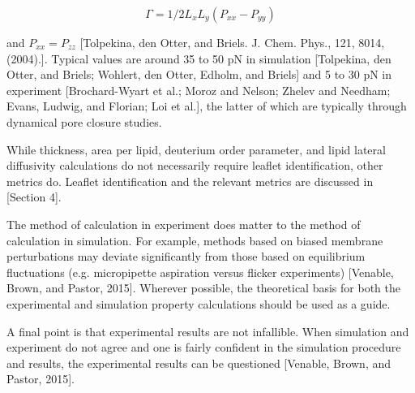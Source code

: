 \documentclass[9pt,bestpractices]{livecoms}
\begin{document}
\begin{equation}
	\label{e:partition}
	\Gamma = 1/2 L_x L_y (P_{xx} - P_{yy})
\end{equation}

and $P_{xx} = P_{zz}$ [Tolpekina, den Otter, and Briels. J. Chem. Phys., 121, 8014, (2004).].
Typical values are around 35 to 50 pN in simulation [Tolpekina, den Otter, and Briels; Wohlert, den Otter, Edholm, and Briels] and 5 to 30 pN in experiment [Brochard-Wyart et al.; Moroz and Nelson; Zhelev and Needham; Evans, Ludwig, and Florian; Loi et al.], the latter of which are typically through dynamical pore closure studies.

While thickness, area per lipid, deuterium order parameter, and lipid lateral diffusivity calculations do not necessarily require leaflet identification, other metrics do. Leaflet identification and the relevant metrics are discussed in [Section 4].

The method of calculation in experiment does matter to the method of calculation in simulation.
For example, methods based on biased membrane perturbations may deviate significantly from those based on equilibrium fluctuations (e.g. micropipette aspiration versus flicker experiments) [Venable, Brown, and Pastor, 2015].
Wherever possible, the theoretical basis for both the experimental and simulation property calculations should be used as a guide.

A final point is that experimental results are not infallible.
When simulation and experiment do not agree and one is fairly confident in the simulation procedure and results, the experimental results can be questioned [Venable, Brown, and Pastor, 2015].
\end{document}
